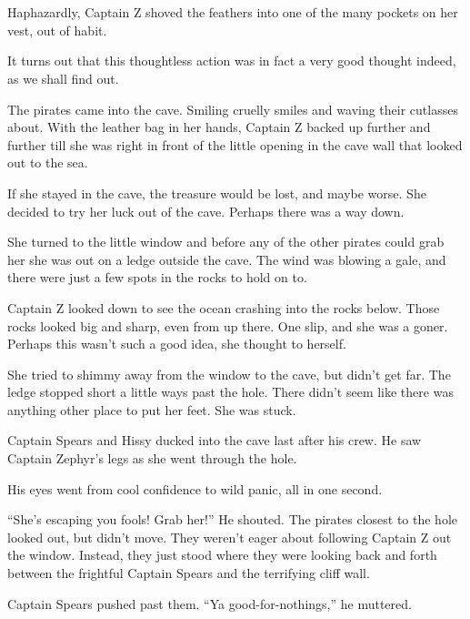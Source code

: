 \documentclass[12pt]{extbook}
\begin{document}
  \section{}\label{section-20}
  
  Haphazardly, Captain Z shoved the feathers into one of the many pockets
  on her vest, out of habit.
  
  It turns out that this thoughtless action was in fact a very good
  thought indeed, as we shall find out.
  
  The pirates came into the cave. Smiling cruelly smiles and waving their
  cutlasses about. With the leather bag in her hands, Captain Z backed up
  further and further till she was right in front of the little opening in
  the cave wall that looked out to the sea.
  
  If she stayed in the cave, the treasure would be lost, and maybe worse.
  She decided to try her luck out of the cave. Perhaps there was a way
  down.
  
  She turned to the little window and before any of the other pirates
  could grab her she was out on a ledge outside the cave. The wind was
  blowing a gale, and there were just a few spots in the rocks to hold on
  to.
  
  Captain Z looked down to see the ocean crashing into the rocks below.
  Those rocks looked big and sharp, even from up there. One slip, and she
  was a goner. Perhaps this wasn't such a good idea, she thought to
  herself.
  
  She tried to shimmy away from the window to the cave, but didn't get
  far. The ledge stopped short a little ways past the hole. There didn't
  seem like there was anything other place to put her feet. She was stuck.
  
  Captain Spears and Hissy ducked into the cave last after his crew. He
  saw Captain Zephyr's legs as she went through the hole.
  
  His eyes went from cool confidence to wild panic, all in one second.
  
  \enquote{She's escaping you fools! Grab her!} He shouted. The pirates
  closest to the hole looked out, but didn't move. They weren't eager
  about following Captain Z out the window. Instead, they just stood where
  they were looking back and forth between the frightful Captain Spears
  and the terrifying cliff wall.
  
  Captain Spears pushed past them. \enquote{Ya good-for-nothings,} he
  muttered.
  
\end{document}
